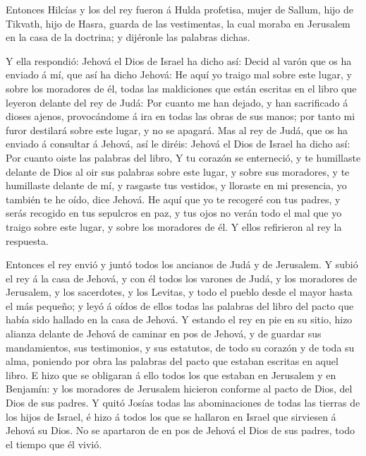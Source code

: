  Entonces Hilcías y los del rey fueron á Hulda profetisa,
mujer de Sallum, hijo de Tikvath, hijo de Hasra, guarda de las
vestimentas, la cual moraba en Jerusalem en la casa de la doctrina; y
dijéronle las palabras dichas.

 Y ella respondió: Jehová el Dios de Israel ha dicho así:
Decid al varón que os ha enviado á mí, que así ha dicho Jehová:
 He aquí yo traigo mal sobre este lugar, y sobre los
moradores de él, todas las maldiciones que están escritas en el libro
que leyeron delante del rey de Judá:  Por cuanto me han
dejado, y han sacrificado á dioses ajenos, provocándome á ira en todas
las obras de sus manos; por tanto mi furor destilará sobre este lugar, y
no se apagará.  Mas al rey de Judá, que os ha enviado á
consultar á Jehová, así le diréis: Jehová el Dios de Israel ha dicho
así: Por cuanto oiste las palabras del libro,  Y tu corazón
se enterneció, y te humillaste delante de Dios al oir sus palabras sobre
este lugar, y sobre sus moradores, y te humillaste delante de mí, y
rasgaste tus vestidos, y lloraste en mi presencia, yo también te he
oído, dice Jehová.  He aquí que yo te recogeré con tus
padres, y serás recogido en tus sepulcros en paz, y tus ojos no verán
todo el mal que yo traigo sobre este lugar, y sobre los moradores de él.
Y ellos refirieron al rey la respuesta.

 Entonces el rey envió y juntó todos los ancianos de Judá y
de Jerusalem.  Y subió el rey á la casa de Jehová, y con él
todos los varones de Judá, y los moradores de Jerusalem, y los
sacerdotes, y los Levitas, y todo el pueblo desde el mayor hasta el más
pequeño; y leyó á oídos de ellos todas las palabras del libro del pacto
que había sido hallado en la casa de Jehová.  Y estando el
rey en pie en su sitio, hizo alianza delante de Jehová de caminar en pos
de Jehová, y de guardar sus mandamientos, sus testimonios, y sus
estatutos, de todo su corazón y de toda su alma, poniendo por obra las
palabras del pacto que estaban escritas en aquel libro.  E
hizo que se obligaran á ello todos los que estaban en Jerusalem y en
Benjamín: y los moradores de Jerusalem hicieron conforme al pacto de
Dios, del Dios de sus padres.  Y quitó Josías todas las
abominaciones de todas las tierras de los hijos de Israel, é hizo á
todos los que se hallaron en Israel que sirviesen á Jehová su Dios. No
se apartaron de en pos de Jehová el Dios de sus padres, todo el tiempo
que él vivió.

